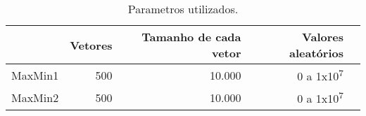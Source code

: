\begin{table}[!htb]
	\centering
	\caption[Parametros utilizados]{Parametros utilizados.
	\label{tab:parametros}}
	\begin{tabular}{rrrrr}
		\toprule
			& Vetores & Tamanho de cada vetor & Valores aleatórios &  \\
		\midrule
			MaxMin1 & 500 & 10.000 & 0 a 1x10\textsuperscript{7} \\
			MaxMin2 & 500 & 10.000 & 0 a 1x10\textsuperscript{7} \\
		\bottomrule
	\end{tabular}
\end{table}
